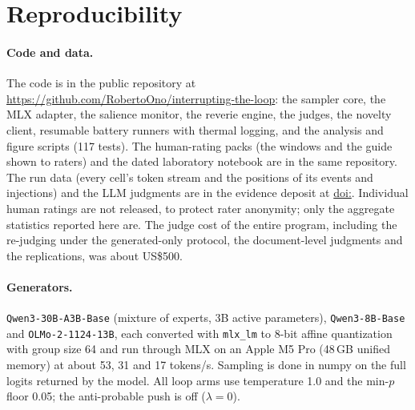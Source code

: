 \section{Reproducibility}
\label{app:repro}

\paragraph{Code and data.} The code is in the public repository at
\url{https://github.com/RobertoOno/interrupting-the-loop}: the sampler core,
the MLX adapter, the salience monitor, the reverie engine, the judges, the
novelty client, resumable battery runners with thermal logging, and the
analysis and figure scripts (117 tests). The human-rating packs (the windows
and the guide shown to raters) and the dated laboratory notebook are in the
same repository. The run data (every cell's token stream and the positions
of its events and injections) and the LLM judgments are in the evidence
deposit at \href{https://doi.org/\evidencedoi}{doi:\evidencedoi}. Individual
human ratings are not released, to protect rater anonymity; only the
aggregate statistics reported here are. The judge cost of the entire
program, including the re-judging under the
generated-only protocol, the document-level judgments and the replications,
was about US\$500.

\paragraph{Generators.} \texttt{Qwen3-30B-A3B-Base} (mixture of experts, 3B
active parameters), \texttt{Qwen3-8B-Base} and \texttt{OLMo-2-1124-13B},
each converted with \texttt{mlx\_lm} to 8-bit affine quantization with group
size 64 and run through MLX on an Apple M5 Pro (48\,GB unified memory) at
about 53, 31 and 17 tokens/s. Sampling is done in numpy on the full logits
returned by the model. All loop arms use temperature 1.0 and the min-$p$ floor
0.05; the anti-probable push is off ($\lambda=0$).


